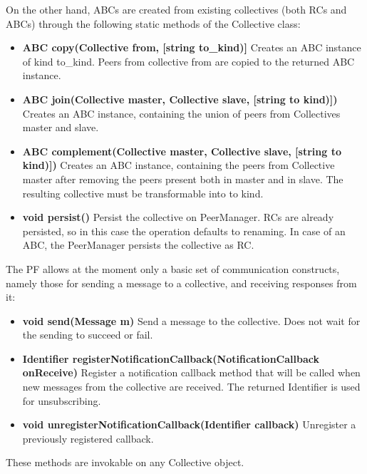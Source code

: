 On the other hand, ABCs are created from existing collectives (both RCs and ABCs) through the following static methods of the Collective class:
\begin{itemize}
\item {\bf ABC copy(Collective from, [string to\_kind)]} Creates an ABC instance of kind to\_kind. Peers from collective from are copied to the returned ABC instance. 
\item {\bf ABC join(Collective master, Collective slave, [string to kind)])} Creates an ABC instance, containing the union of peers from Collectives master and slave. %
\item {\bf ABC complement(Collective master, Collective slave, [string to kind)])} Creates an ABC instance, containing the peers from Collective master after removing the peers present both in master and in slave. The resulting collective must be transformable into to kind. %
\item {\bf void persist()} Persist the collective on PeerManager. RCs are already persisted, so in this case the operation defaults to renaming. In case of an ABC, the PeerManager persists the collective as RC. %
\end{itemize}

The PF allows at the moment only a basic set of communication constructs, namely those for sending a message to a %
collective, and receiving responses from it:
\begin{itemize}
\item {\bf void send(Message m)} Send a message to the collective. Does not wait for the sending to succeed or fail. 
\item {\bf Identifier registerNotificationCallback(NotificationCallback onReceive)} Register a notification callback method that will be called when new messages from the collective are received. The returned Identifier is used for unsubscribing.
\item {\bf void unregisterNotificationCallback(Identifier callback)} Unregister a previously registered callback.
\end{itemize}
These methods are invokable on any Collective object.



